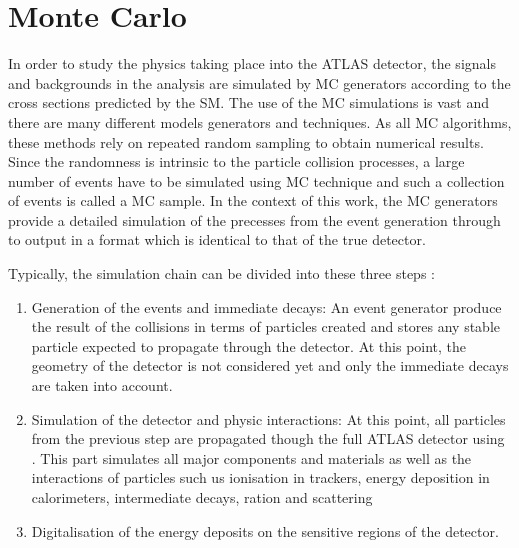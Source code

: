 


\section{Monte Carlo}
\label{sec:Chap3.1:MC}
In order to study the physics taking place into the ATLAS detector, the signals and backgrounds in the analysis are
simulated by MC generators according to the cross sections predicted by the SM. 
The use of the MC simulations is vast and there are many different models generators and techniques. As all
 MC algorithms, these methods rely on repeated random sampling to obtain numerical results. %
Since the randomness is intrinsic to the particle collision processes, a large number of events 
have to be simulated using MC technique and such a collection of events is called a MC sample.
In the context of this work, the MC generators provide a detailed simulation of the precesses from the event
generation through to output in a format which is identical to that of the true detector. 

Typically, the simulation chain can be divided into these three steps \cite{ATLAS:2010arf}:
\begin{enumerate}
    \item Generation of the events and immediate decays: %
    		An event generator produce the result of the collisions in terms of particles created and stores any
		stable particle expected to propagate through the detector. At this point, the geometry of the detector
		is not considered yet and only the immediate decays are taken into account. 
    \item Simulation of the detector and physic interactions:  %
    		At this point, all particles from the previous step are propagated though the full ATLAS detector
		using \GEANT. This part simulates all major components and materials as well as the
		interactions of particles such us ionisation in trackers, energy deposition in calorimeters, intermediate
		decays, ration and scattering
    		
    \item Digitalisation of the energy deposits on the sensitive regions of the detector.
\end{enumerate}

